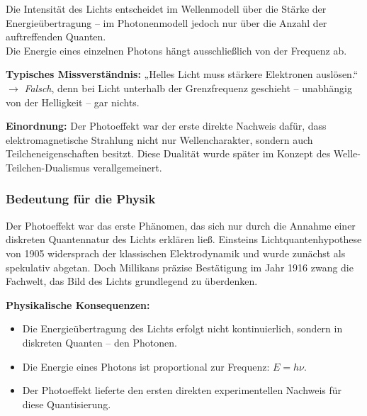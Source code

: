\medskip

\begin{tcolorbox}[didaktikbox, title=Didaktische Klarstellung]
	\label{box:didaktischeKlarstellung}
	\small
	Die Intensität des Lichts entscheidet im Wellenmodell über die Stärke der Energieübertragung – im Photonenmodell jedoch nur über die Anzahl der auftreffenden Quanten.\\
	Die Energie eines einzelnen Photons hängt ausschließlich von der Frequenz ab.
\end{tcolorbox}
\medskip
{}
\textbf{Typisches Missverständnis:}  
„Helles Licht muss stärkere Elektronen auslösen.“  
$\rightarrow$ \emph{Falsch}, denn bei Licht unterhalb der Grenzfrequenz geschieht – unabhängig von der Helligkeit – gar nichts.

\textbf{Einordnung:}  
Der Photoeffekt war der erste direkte Nachweis dafür, dass elektromagnetische Strahlung nicht nur Wellencharakter, sondern auch Teilcheneigenschaften besitzt. Diese Dualität wurde später im Konzept des Welle-Teilchen-Dualismus verallgemeinert.
\subsubsection{Bedeutung für die Physik}

Der Photoeffekt war das erste Phänomen, das sich nur durch die Annahme einer diskreten Quantennatur des Lichts erklären ließ. Einsteins Lichtquantenhypothese von 1905 widersprach der klassischen Elektrodynamik und wurde zunächst als spekulativ abgetan. Doch Millikans präzise Bestätigung im Jahr 1916 zwang die Fachwelt, das Bild des Lichts grundlegend zu überdenken.

\textbf{Physikalische Konsequenzen:}
\begin{itemize}
	\item Die Energieübertragung des Lichts erfolgt nicht kontinuierlich, sondern in diskreten Quanten – den Photonen.
	\item Die Energie eines Photons ist proportional zur Frequenz: \( E = h\nu \).
	\item Der Photoeffekt lieferte den ersten direkten experimentellen Nachweis für diese Quantisierung.
\end{itemize}

